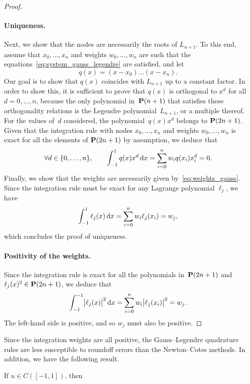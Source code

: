 \begin{proof}
    \paragraph{Uniqueness.}
    Next,
    we show that the nodes are necessarily the roots of $L_{n+1}$.
    To this end,
    assume that $x_0, \dotsc, x_n$ and weights $w_0, \dotsc, w_n$ are such that the equations~\eqref{eq:system_gauss_legendre} are satisfied,
    and let
    \[
        q(x) = (x - x_0) \dotsc (x - x_n).
    \]
    Our goal is to show that $q(x)$ coincides with $L_{n+1}$ up to a constant factor.
    In order to show this,
    it is sufficient to prove that $q(x)$ is orthogonal to $x^d$ for all $d = 0, \dotsc, n$,
    because the only polynomial in~$\mathbf P(n+1)$ that satisfies these orthogonality relations is the Legendre polynomial~$L_{n+1}$,
    or a multiple thereof.
    For the values of~$d$ considered, the polynomial~$q(x) x^d$ belongs to $\mathbf P(2n+1)$.
    Given that the integration rule with nodes $x_0, \dotsc, x_n$ and weights $w_0,\dotsc, w_n$ is exact for all the elements of $\mathbf P(2n+1)$ by assumption,
    we deduce that
    \[
        \forall d \in \{0, \dotsc, n\},
        \qquad \int_{-1}^{1} q(x) x^d \, \mathrm d x = \sum_{i=0}^{n} w_i q(x_i) x_i^d = 0.
    \]
    Finally, we show that the weights are necessarily given by~\eqref{eq:weights_gauss}.
    Since the integration rule must be exact for any Lagrange polynomial $\ell_j$,
    we have
    \[
        \int_{-1}^{1} \ell_j(x) \, \mathrm d x = \sum_{i=0}^{n} w_i \ell_j(x_i) = w_j,
    \]
    which concludes the proof of uniqueness.
    \paragraph{Positivity of the weights.}
    Since the integration rule is exact for all the polynomials in~$\mathbf P(2n+1)$ and $\ell_j(x)^2 \in \mathbf P(2n+1)$,
    we deduce that
    \[
        \int_{-1}^{-1} \bigl\lvert \ell_j(x) \bigr\rvert^2 \, \mathrm d x
        = \sum_{i=0}^{n} w_i \bigl\lvert \ell_j(x_i) \bigr\rvert^2 = w_j.
    \]
    The left-hand side is positive,
    and so $w_j$ must also be positive.
\end{proof}

Since the integration weights are all positive,
the Gauss--Legendre quadrature rules are less susceptible to roundoff errors than the Newton--Cotes methods.
In addition, we have the following result.

\begin{theorem}
    If $u \in C([-1, 1])$,
    then
\end{theorem}

